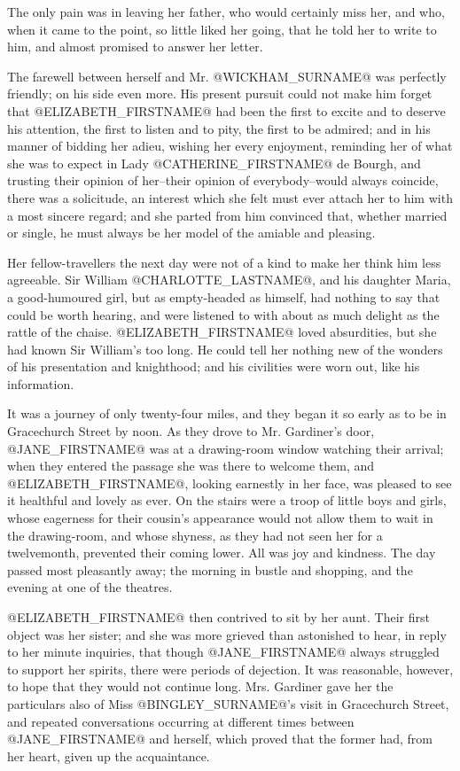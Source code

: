 The only pain was in leaving her father, who would certainly miss her,
and who, when it came to the point, so little liked her going, that he
told her to write to him, and almost promised to answer her letter.

The farewell between herself and Mr. @WICKHAM_SURNAME@ was perfectly friendly; on
his side even more. His present pursuit could not make him forget that
@ELIZABETH_FIRSTNAME@ had been the first to excite and to deserve his attention, the
first to listen and to pity, the first to be admired; and in his manner
of bidding her adieu, wishing her every enjoyment, reminding her of
what she was to expect in Lady @CATHERINE_FIRSTNAME@ de Bourgh, and trusting their
opinion of her--their opinion of everybody--would always coincide, there
was a solicitude, an interest which she felt must ever attach her to
him with a most sincere regard; and she parted from him convinced that,
whether married or single, he must always be her model of the amiable
and pleasing.

Her fellow-travellers the next day were not of a kind to make her
think him less agreeable. Sir William @CHARLOTTE_LASTNAME@, and his daughter Maria, a
good-humoured girl, but as empty-headed as himself, had nothing to say
that could be worth hearing, and were listened to with about as much
delight as the rattle of the chaise. @ELIZABETH_FIRSTNAME@ loved absurdities, but
she had known Sir William's too long. He could tell her nothing new of
the wonders of his presentation and knighthood; and his civilities were
worn out, like his information.

It was a journey of only twenty-four miles, and they began it so early
as to be in Gracechurch Street by noon. As they drove to Mr. Gardiner's
door, @JANE_FIRSTNAME@ was at a drawing-room window watching their arrival; when
they entered the passage she was there to welcome them, and @ELIZABETH_FIRSTNAME@,
looking earnestly in her face, was pleased to see it healthful and
lovely as ever. On the stairs were a troop of little boys and girls,
whose eagerness for their cousin's appearance would not allow them to
wait in the drawing-room, and whose shyness, as they had not seen
her for a twelvemonth, prevented their coming lower. All was joy and
kindness. The day passed most pleasantly away; the morning in bustle and
shopping, and the evening at one of the theatres.

@ELIZABETH_FIRSTNAME@ then contrived to sit by her aunt. Their first object was her
sister; and she was more grieved than astonished to hear, in reply to
her minute inquiries, that though @JANE_FIRSTNAME@ always struggled to support her
spirits, there were periods of dejection. It was reasonable, however,
to hope that they would not continue long. Mrs. Gardiner gave her the
particulars also of Miss @BINGLEY_SURNAME@'s visit in Gracechurch Street, and
repeated conversations occurring at different times between @JANE_FIRSTNAME@ and
herself, which proved that the former had, from her heart, given up the
acquaintance.

